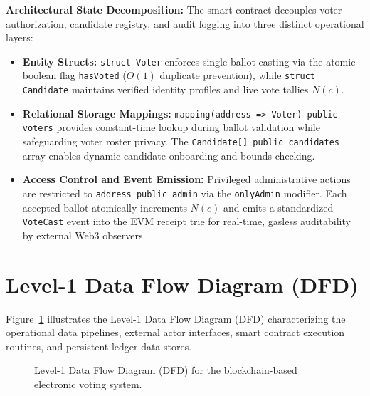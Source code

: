 \documentclass[12pt,a4paper]{report}
\begin{document}
\noindent\textbf{Architectural State Decomposition:}
The smart contract decouples voter authorization, candidate registry, and audit logging into three distinct operational layers:
\begin{itemize}
    \setlength{\itemsep}{2pt}
    \setlength{\parskip}{0pt}
    \item \textbf{Entity Structs:} \texttt{struct Voter} enforces single-ballot casting via the atomic boolean flag \texttt{hasVoted} ($O(1)$ duplicate prevention), while \texttt{struct Candidate} maintains verified identity profiles and live vote tallies $N(c)$.
    \item \textbf{Relational Storage Mappings:} \texttt{mapping(address => Voter) public voters} provides constant-time lookup during ballot validation while safeguarding voter roster privacy. The \texttt{Candidate[] public candidates} array enables dynamic candidate onboarding and bounds checking.
    \item \textbf{Access Control and Event Emission:} Privileged administrative actions are restricted to \texttt{address public admin} via the \texttt{onlyAdmin} modifier. Each accepted ballot atomically increments $N(c)$ and emits a standardized \texttt{VoteCast} event into the EVM receipt trie for real-time, gasless auditability by external Web3 observers.
\end{itemize}
\section{Level-1 Data Flow Diagram (DFD)}
\vspace{-0.3em}
Figure~\ref{fig:dfd1} illustrates the Level-1 Data Flow Diagram (DFD) characterizing the operational data pipelines, external actor interfaces, smart contract execution routines, and persistent ledger data stores.

\begin{figure}[H]
\centering
\vspace{-0.9em}
\vspace{-0.6em}
\caption{Level-1 Data Flow Diagram (DFD) for the blockchain-based electronic voting system.}
\label{fig:dfd1}
\end{figure}
\vspace{-0.8em}
\end{document}
